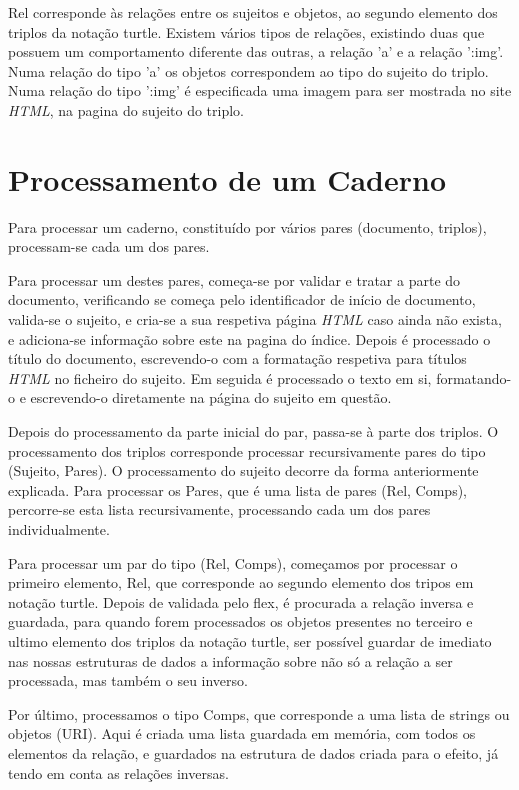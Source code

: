 \documentclass[a4paper]{report}
\begin{document}
Rel corresponde às relações entre os sujeitos e objetos, ao segundo elemento dos
triplos da notação turtle. Existem vários tipos de relações, existindo duas que
possuem um comportamento diferente das outras, a relação 'a' e a relação ':img'.
Numa relação do tipo 'a' os objetos correspondem ao tipo do sujeito do triplo.
Numa relação do tipo ':img' é especificada uma imagem para ser mostrada no site
\textit{HTML}, na pagina do sujeito do triplo.

\pagebreak
\section{Processamento de um Caderno}

Para processar um caderno, constituído por vários pares (documento, triplos),
processam-se cada um dos pares.

Para processar um destes pares, começa-se por validar e tratar a parte do
documento, verificando se começa pelo identificador de início de documento,
valida-se o sujeito, e cria-se a sua respetiva página \textit{HTML} caso ainda
não exista, e adiciona-se informação sobre este na
pagina do índice. Depois é processado o título do documento, escrevendo-o com a
formatação respetiva para títulos \textit{HTML} no ficheiro do sujeito. Em
seguida é processado o texto em si, formatando-o e escrevendo-o diretamente na
página do sujeito em questão.

Depois do processamento da parte inicial do par, passa-se à parte dos triplos.
O processamento dos triplos corresponde processar recursivamente pares do tipo
(Sujeito, Pares). O processamento do sujeito decorre da forma anteriormente
explicada. Para processar os Pares, que é uma lista de pares (Rel, Comps),
percorre-se esta lista recursivamente, processando cada um dos pares
individualmente.

Para processar um par do tipo (Rel, Comps), começamos por processar o primeiro
elemento, Rel, que corresponde ao segundo elemento dos tripos em notação turtle.
Depois de validada pelo flex, é procurada a relação inversa e guardada, para
quando forem processados os objetos presentes no terceiro e ultimo elemento dos
triplos da notação turtle, ser possível guardar de imediato nas nossas 
estruturas de dados a informação sobre não só a relação a ser processada, mas
também o seu inverso.

Por último, processamos o tipo Comps, que corresponde a uma lista de strings ou
objetos (URI). Aqui é criada uma lista guardada em memória, com todos os
elementos da relação, e guardados na estrutura de dados criada para o efeito,
já tendo em conta as relações inversas.
\end{document}
